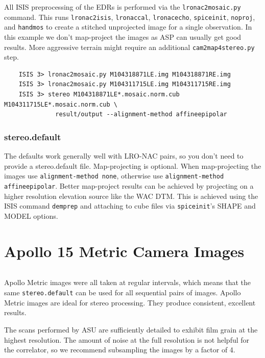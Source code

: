 All ISIS preprocessing of the EDRs is performed via the
\texttt{lronac2mosaic.py} command. This runs \texttt{lronac2isis},
\texttt{lronaccal}, \texttt{lronacecho}, \texttt{spiceinit},
\texttt{noproj}, and \texttt{handmos} to create a stitched unprojected
image for a single observation. In this example we don't map-project
the images as ASP can usually get good results. More aggressive
terrain might require an additional \texttt{cam2map4stereo.py} step.

\begin{verbatim}
    ISIS 3> lronac2mosaic.py M104318871LE.img M104318871RE.img
    ISIS 3> lronac2mosaic.py M104311715LE.img M104311715RE.img
    ISIS 3> stereo M104318871LE*.mosaic.norm.cub M104311715LE*.mosaic.norm.cub \
              result/output --alignment-method affineepipolar
\end{verbatim}

\subsubsection*{stereo.default}

The defaults work generally well with LRO-NAC pairs, so you don't need
to provide a stereo.default file. Map-projecting is optional. When
map-projecting the images use \texttt{alignment-method none}, otherwise
use \texttt{alignment-method affineepipolar}. Better map-project results
can be achieved by projecting on a higher resolution elevation source
like the WAC DTM. This is achieved using the ISIS command \texttt{demprep}
and attaching to cube files via \texttt{spiceinit}'s SHAPE and MODEL
options.

\section{Apollo 15 Metric Camera Images}

\begin{tabular}{ r c r c}

\end{tabular}

Apollo Metric images were all taken at regular intervals, which means
that the same \texttt{stereo.default} can be used for all sequential
pairs of images. Apollo Metric images are ideal for stereo processing.
They produce consistent, excellent results.

The scans performed by ASU are sufficiently detailed to exhibit film
grain at the highest resolution.  The amount of noise at the full
resolution is not helpful for the correlator, so we recommend
subsampling the images by a factor of 4.

